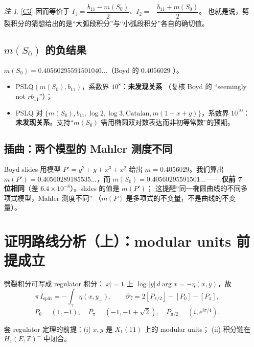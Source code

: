 \documentclass[11pt,a4paper]{ctexart}
\theoremstyle{remark}
\newtheorem*{remark}{注}
\newcommand{\ZZ}{\mathbb{Z}}
\newcommand{\bN}{b_{11}}
\newcommand{\dd}{\,d}
\newcommand{\Isplit}{I_{\mathrm{split}}}
\begin{document}
\begin{remark}
\eqref{C3} 因而等价于 $I_1=\dfrac{\bN-m(S_0)}{2}$、$I_2=-\dfrac{\bN+m(S_0)}{2}$。
也就是说，劈裂积分的猜想给出的是“大弧段积分”与“小弧段积分”各自的确切值。
\end{remark}

\subsection{$m(S_0)$ 的负结果}

$m(S_0)=0.40560295591501040\ldots$（Boyd 的 $0.4056029$ \checkmark）。
\begin{itemize}[nosep]
\item PSLQ$(m(S_0),\bN)$，系数界 $10^8$：\textbf{未发现关系}
（复核 Boyd 的 “seemingly not $r\bN$”）；
\item PSLQ 对 $\{m(S_0),\bN,\log2,\log3,\mathrm{Catalan},m(1+x+y)\}$，系数界 $10^{10}$：
\textbf{未发现关系}。支持“$m(S_0)$ 需用椭圆双对数表达而非初等常数”的预期。
\end{itemize}

\subsection{插曲：两个模型的 Mahler 测度不同}

Boyd slides 用模型 $P'=y^2+y+x^3+x^2$ 给出 $m=0.4056029$。我们算出
$m(P')=0.40560289185535\ldots$，而 $m(S_0)=0.40560295591501\ldots$——
\textbf{仅前 7 位相同}（差 $6.4\times10^{-8}$）。slides 的值是 $m(P')$；
这提醒“同一椭圆曲线的不同多项式模型，Mahler 测度不同”
（$m(P)$ 是多项式的不变量，不是曲线的不变量）。

\section{证明路线分析（上）：modular units 前提成立}\label{sec:proof}

劈裂积分可写成 regulator 积分：$|x|=1$ 上 $\log|y|\dd\arg x=-\eta(x,y)$，故
\[
\pi\,\Isplit=-\int_\gamma\eta(x,y_-),\qquad
\partial\gamma=2[P_{\pi/2}]-[P_0]-[P_\pi],
\]
\[
P_0=(1,-1),\quad P_\pi=(-1,-1+\sqrt2),\quad P_{\pi/2}=(i,e^{i\pi/4}).
\]

套 regulator 定理的前提：(i) $x,y$ 是 $X_1(11)$ 上的 modular units；
(ii) 积分链在 $H_1(E,\ZZ)^-$ 中闭合。
\end{document}
